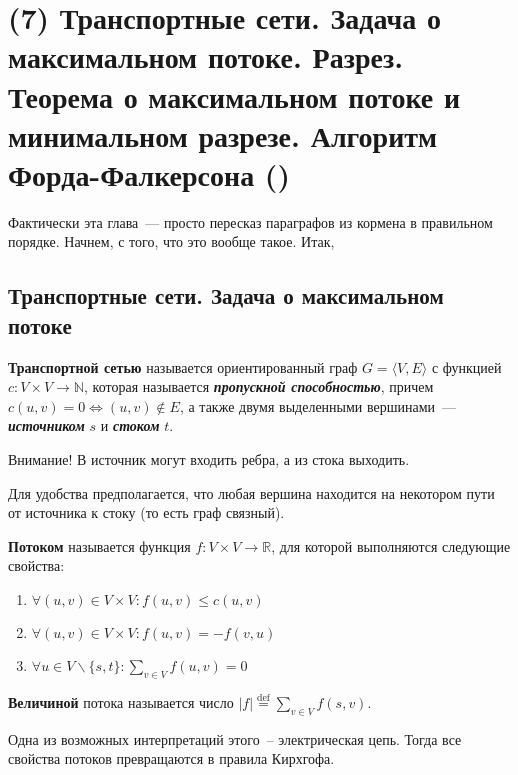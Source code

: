 \let\bf\bfseries
\let\it\itshape
\section{(7) Транспортные сети. Задача о максимальном потоке. Разрез. Теорема о максимальном потоке и минимальном разрезе. Алгоритм Форда-Фалкерсона (\groth)}
Фактически эта глава~--- просто пересказ параграфов из кормена в правильном порядке. Начнем, с того, что это вообще такое. Итак,
\subsection{Транспортные сети. Задача о максимальном потоке}
\begin{definition}
	{\bfseries Транспортной сетью} называется ориентированный граф $G=\langle V,E\rangle$ с функцией $c\colon V\times V\to\mathbb{N}$, которая называется {\bf\it пропускной способностью}, причем $c(u,v)=0\iff (u,v)\not\in E$, а также двумя выделенными вершинами~--- {\bf\it источником} $s$ и {\bf\it стоком} $t$.
\end{definition}
Внимание! В источник могут входить ребра, а из стока выходить.

Для удобства предполагается, что любая вершина находится на некотором пути от источника к стоку (то есть граф связный).
\begin{example}
	\needpicture
\end{example}
\begin{definition}
	{\bfseries Потоком} называется функция $f\colon V\times V\to\mathbb{R}$, для которой выполняются следующие свойства:
	\begin{enumerate}
		\item $\forall(u,v)\in V\times V\colon f(u,v)\le c(u,v)$
		\item $\forall(u,v)\in V\times V\colon f(u,v)=-f(v,u)$
		\item $\forall u\in V\smallsetminus\{s,t\}\colon \sum_{v\in V} f(u,v)=0$
	\end{enumerate}
	{\bfseries Величиной} потока называется число $|f|\overset{\mathrm{def}}{=}\sum_{v\in V}f(s,v)$.
\end{definition}
Одна из возможных интерпретаций этого~-- электрическая цепь. Тогда все свойства потоков превращаются в правила Кирхгофа.

